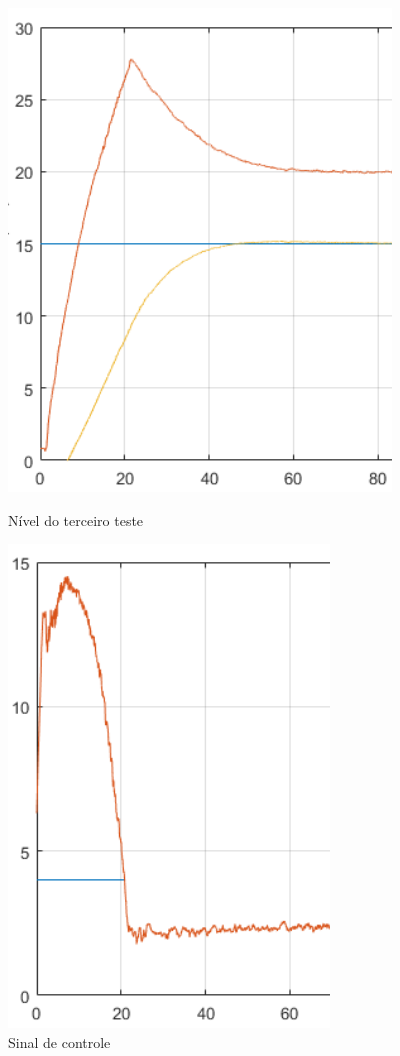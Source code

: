 \documentclass[
	12pt,				%
	openany,			%
	oneside,			%
	a4paper,			%
	english,			%
	french,				%
	spanish,			%
	brazil,				%
	]{abntex2}
\begin{document}
{\begin{figure}[h]
	\centering
	\begin{minipage}{.5\textwidth}
		\centering
		\includegraphics[scale=0.45]{imagens/3A_3_niveis.png}
		\caption{Nível do terceiro teste}
		\label{fig:niveis_3A_3}		
	\end{minipage}%
	\begin{minipage}{.5\textwidth}
		\centering
		\includegraphics[scale=0.45]{imagens/3A_3_sinal_controle.png}
		\caption{Sinal de controle}
		\label{fig:sinal_3A_3}		
	\end{minipage}
\end{figure}

}
\end{document}
